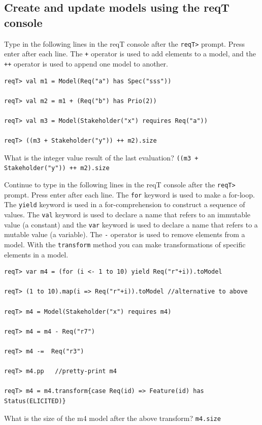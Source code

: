 \documentclass[11pt]{article}
\begin{document}
\subsection{Create and update models using the reqT console}

\begin{framed}\noindent
Type in the following lines in the reqT console after the \verb+reqT>+ prompt. Press enter after each line. The \verb?+? operator is used to add elements to a model, and the  \verb?++? operator is used to append one model to another.

{\small\begin{verbatim}
reqT> val m1 = Model(Req("a") has Spec("sss"))

reqT> val m2 = m1 + (Req("b") has Prio(2))

reqT> val m3 = Model(Stakeholder("x") requires Req("a"))

reqT> ((m3 + Stakeholder("y")) ++ m2).size
\end{verbatim}}


\noindent What is the integer value result of the last evaluation? 
\newline 
\verb?((m3 + Stakeholder("y")) ++ m2).size?
\newline
\newline \underline{\hspace{10cm}}

\vspace{7mm}
\noindent Continue to type in the following lines in the reqT console after the \verb+reqT>+ prompt. Press enter after each line. The \verb+for+ keyword is used to make a for-loop. The \verb+yield+ keyword is used in a for-comprehension to construct a sequence of values.  The \verb+val+ keyword is used to declare a name that refers to an immutable value (a constant) and the \verb+var+ keyword is used to declare a name that refers to a mutable value (a variable). The \verb?-? operator is used to remove elements from a model. With the \verb+transform+ method you can make transformations of specific elements in a model. 


{\scriptsize\begin{verbatim}
reqT> var m4 = (for (i <- 1 to 10) yield Req("r"+i)).toModel

reqT> (1 to 10).map(i => Req("r"+i)).toModel //alternative to above

reqT> m4 = Model(Stakeholder("x") requires m4)

reqT> m4 = m4 - Req("r7")

reqT> m4 -=  Req("r3")

reqT> m4.pp   //pretty-print m4

reqT> m4 = m4.transform{case Req(id) => Feature(id) has Status(ELICITED)}
\end{verbatim}}
\end{framed}
\begin{framed}\noindent
What is the size of the m4 model after the above transform? 
\newline
\verb+m4.size+
\newline
\newline \underline{\hspace{10cm}}
\end{framed}
\end{document}
